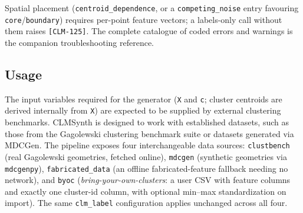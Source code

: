 \documentclass[a4paper,12pt]{article}
\begin{document}
\noindent Spatial placement (\texttt{centroid\_dependence}, or a
\texttt{competing\_noise} entry favouring \texttt{core}/\texttt{boundary}) requires per-point
feature vectors; a labels-only call without them raises \texttt{[CLM-125]}. The complete
catalogue of coded errors and warnings is the companion troubleshooting reference.
\newpage
\subsection*{Usage}
The input variables required for the generator (\texttt{X} and \texttt{c}; cluster centroids are derived internally from \texttt{X}) are expected to be supplied by external clustering benchmarks. CLMSynth is designed to work with established datasets, such as those from the Gagolewski clustering benchmark suite or datasets generated via MDCGen. The pipeline exposes four interchangeable data sources: \texttt{clustbench} (real Gagolewski geometries, fetched online), \texttt{mdcgen} (synthetic geometries via \texttt{mdcgenpy}), \texttt{fabricated\_data} (an offline fabricated-feature fallback needing no network), and \texttt{byoc} (\emph{bring-your-own-clusters}: a user CSV with feature columns and exactly one cluster-id column, with optional min--max standardization on import). The same \texttt{clm\_label} configuration applies unchanged across all four.
\end{document}
